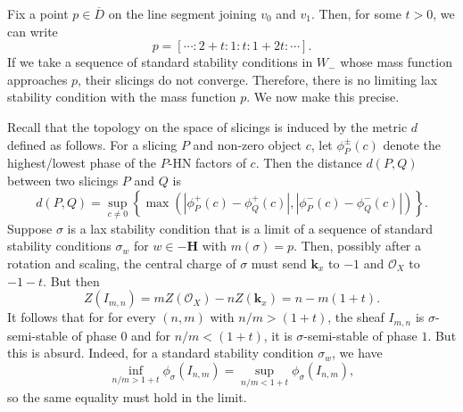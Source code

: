 \documentclass{amsart}
\begin{document}
Fix a point \(p \in \overline D\) on the line segment joining \(v_0\) and \(v_1\).
Then, for some \(t > 0\), we can write
\[ p = [ \cdots : 2 + t: 1: t : 1+2t : \cdots].\]
If we take a sequence of standard stability conditions in \(W_{-}\) whose mass function approaches \(p\), their slicings do not converge.
Therefore, there is no limiting lax stability condition with the mass function \(p\).
We now make this precise.

Recall that the topology on the space of slicings is induced by the metric \(d\) defined as follows.
For a slicing \(P\) and non-zero object \(c\), let \(\phi^{\pm}_P(c)\) denote the highest/lowest phase of the \(P\)-HN factors of \(c\).
Then the distance \(d(P,Q)\) between two slicings \(P\) and \(Q\) is
\[ d(P,Q) = \operatorname{sup}_{c \neq 0}\left\{ \max(|\phi_{P}^+(c) - \phi_{Q}^+(c)|, |\phi^-_P(c) - \phi^-_Q(c)|)\right\}.\]
Suppose \(\sigma\) is a lax stability condition that is a limit of a sequence of standard stability conditions \(\sigma_w\) for \(w \in -\mathbf{H}\) with \(m(\sigma) = p\).
Then, possibly after a rotation and scaling, the central charge of \(\sigma\) must send \(\mathbf{k}_x\) to \(-1\) and \(\mathcal{O}_X\) to \(-1-t\).
But then
\[ Z(I_{m,n}) = mZ(\mathcal{O}_X) - n Z(\mathbf{k}_x) = n - m(1+t).\]
It follows that for for every \((n,m)\) with \(n/m > (1+t)\), the sheaf \(I_{m,n}\) is \(\sigma\)-semi-stable of phase \(0\) and for \(n/m < (1+t)\), it is \(\sigma\)-semi-stable of phase \(1\).
But this is absurd.
Indeed, for a standard stability condition \(\sigma_w\), we have
\[ \inf_{n/m > 1+t} \phi_{\sigma}(I_{n,m}) = \sup_{n/m < 1+t} \phi_{\sigma}(I_{n,m}),\]
so the same equality must hold in the limit.
\end{document}
